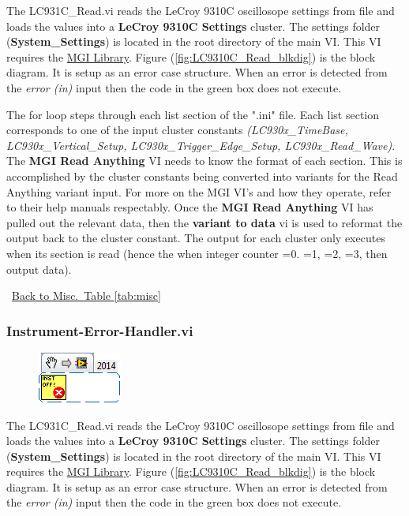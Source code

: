 \documentclass[11pt,a4paper,oldfontcommands]{memoir}
\begin{document}
The LC931C\_Read.vi reads the LeCroy 9310C oscillosope settings from file and loads the values into a \textbf{LeCroy 9310C Settings} cluster. The settings folder (\textbf{System\_Settings}) is located in the root directory of the main VI. This VI requires the \href{http://sine.ni.com/nips/cds/view/p/lang/en/nid/209753}{MGI Library}. Figure (\ref{fig:LC9310C_Read_blkdig}) is the block diagram.  It is setup as an error case structure. When an error is detected from the \textit{error (in)} input then the code in the green box does not execute.

The for loop steps through each list section of the ".ini" file. Each list section corresponds to one of the input cluster constants \textit{(LC930x\_TimeBase, LC930x\_Vertical\_Setup, LC930x\_Trigger\_Edge\_Setup, LC930x\_Read\_Wave)}. The \textbf{MGI Read Anything} VI needs to know the format of each section. This is accomplished by the cluster constants being converted into variants for the Read Anything variant input.  For more on the MGI VI's and how they operate, refer to their help manuals respectably. Once the \textbf{MGI Read Anything} VI has pulled out the relevant data, then the \textbf{variant to data} vi is used to reformat the output back to the cluster constant. The output for each cluster only executes when its section is read (hence the when integer counter =0. =1, =2, =3, then output data).

\noindent\hrulefill\, \hyperref[tab:misc]{Back to Misc.\ Table \ref{tab:misc}}

\subsubsection{Instrument-Error-Handler.vi} \label{IEH}
\noindent\hrulefill

\begin{figure}[h]
	\includegraphics[scale=0.625]{Instrument-error-handler_main_01}
	\label{fig:Instrument-error-handler_main_01}
\end{figure}

The LC931C\_Read.vi reads the LeCroy 9310C oscillosope settings from file and loads the values into a \textbf{LeCroy 9310C Settings} cluster. The settings folder (\textbf{System\_Settings}) is located in the root directory of the main VI. This VI requires the \href{http://sine.ni.com/nips/cds/view/p/lang/en/nid/209753}{MGI Library}. Figure (\ref{fig:LC9310C_Read_blkdig}) is the block diagram.  It is setup as an error case structure. When an error is detected from the \textit{error (in)} input then the code in the green box does not execute.
\end{document}
